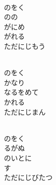 \documentclass[10pt,b5j]{tarticle} %
\begin{document}
\vspace{1.5em} %
\newcommand{\linespace}{0.5em} %
\newcommand{\blocksize}{0.5\hsize} %
\newcommand{\itemmargin}{3em} %
\begin{enumerate} %
    \setlength{\itemindent}{\itemmargin} %
    \begin{minipage}[c]{\blocksize}
    
        \vspace{\linespace}
        \item~\\
        のをく\\
        のの\\
        がにめ\\
        がれる\\
        ただにじもう
        
    \end{minipage}
    \begin{minipage}[c]{\blocksize}
        
        \vspace{\linespace}
        \item~\\
        のをく\\
        かなり\\
        なるをめて\\
        かれる\\
        ただにじまん
        
    \end{minipage}
    \begin{minipage}[c]{\blocksize}
        
        \vspace{\linespace}
        \item~\\
        のをく\\
        るがぬ\\
        のいとに\\
        す\\
        ただにじびたつ
        

\end{minipage}
\end{enumerate}
\end{document}
